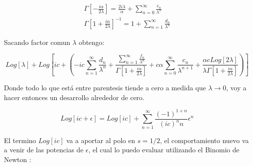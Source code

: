 \begin{equation}
\begin{array}{c}
\Gamma [- \frac{i \alpha}{2 \lambda}] = 
\frac{2 i \lambda}{\alpha}  + 
\sum _{n=0} ^{\infty} \frac{c _n}{\lambda ^n} \\
\Gamma \left[ 1 + \frac{i \alpha}{2 \lambda} \right] ^{-1} = 1 + 
\sum _{n=1} ^{\infty} \frac{d _n}{\lambda ^n}
\end{array}
\end{equation}

Sacando factor comun $\lambda$ obtengo:

\begin{equation}
Log[\lambda] + 
Log \left[
	 i  c +
	\left(
		- i c \sum _{n=1} ^{\infty} \frac{d _n}{\lambda ^n} +
		\frac{\sum _{n=1} ^{\infty} \frac{f _n}{\lambda ^n}}
			 {\Gamma[1+ \frac{i \alpha}{2 \lambda}]}		
		+ c \alpha \sum _{n=0} ^{\infty} \frac{c _n}{\lambda ^{n+1}} +
		\frac{\alpha c Log[2 \lambda]}{\lambda \Gamma [1 + \frac{i \alpha}{2 \lambda} ]}	
		\right)
		\right]		
\end{equation}


Donde todo lo que está entre parentesis tiende a cero a medida que $\lambda \rightarrow 0$, voy a hacer entonces un desarrollo alrededor de cero.

\begin{equation}
Log[i c + \epsilon] =
Log[i c] + 
\sum _{n=1} ^{\infty}
	\frac{(-1) ^{1+n} }
     	{(i c) ^n n}
     \epsilon ^{n}
\end{equation}

El termino $Log[i c]$ va a aportar al polo en $s=1/2$, el comportamiento nuevo va a venir de las potencias de $\epsilon$, el cual lo puedo evaluar utilizando el Binomio de Newton :



